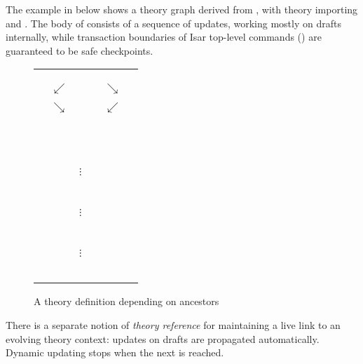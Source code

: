 \begin{isabellebody}
\begin{isamarkuptext}
  \medskip The example in  below shows a theory
  graph derived from , with theory 
  importing  and .  The body of  consists of a sequence of updates, working mostly on
  drafts internally, while transaction boundaries of Isar top-level
  commands () are guaranteed to be safe
  checkpoints.

  \begin{figure}[htb]
  \begin{center}
  \begin{tabular}{rcccl}
        &            & \isa{Pure} \\
        &            & \isa{{\isaliteral{5C3C646F776E3E}{\isasymdown}}} \\
        &            & \isa{FOL} \\
        & $\swarrow$ &              & $\searrow$ & \\
  \isa{Nat} &    &              &            & \isa{List} \\
        & $\searrow$ &              & $\swarrow$ \\
        &            & \isa{Length} \\
        &            & \multicolumn{3}{l}{~~\hyperlink{keyword.imports}{\mbox{\isa{\isakeyword{imports}}}}} \\
        &            & \multicolumn{3}{l}{~~\hyperlink{keyword.begin}{\mbox{\isa{\isakeyword{begin}}}}} \\
        &            & $\vdots$~~ \\
        &            & \isa{{\isaliteral{5C3C62756C6C65743E}{\isasymbullet}}}~~ \\
        &            & $\vdots$~~ \\
        &            & \isa{{\isaliteral{5C3C62756C6C65743E}{\isasymbullet}}}~~ \\
        &            & $\vdots$~~ \\
        &            & \multicolumn{3}{l}{~~\hyperlink{command.end}{\mbox{\isa{\isacommand{end}}}}} \\
  \end{tabular}
  \caption{A theory definition depending on ancestors}\label{fig:ex-theory}
  \end{center}
  \end{figure}

  \medskip There is a separate notion of \emph{theory reference} for
  maintaining a live link to an evolving theory context: updates on
  drafts are propagated automatically.  Dynamic updating stops when
  the next  is reached.


\end{isamarkuptext}
\end{isabellebody}
